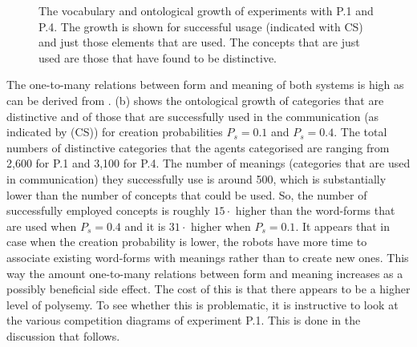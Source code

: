 \begin{figure}
\centering
{}
\caption{The vocabulary and ontological growth of experiments with P.1 and P.4. The growth is shown for successful usage (indicated with CS) and just those elements that are used. The concepts that are just used are those that have found to be distinctive.}
\label{f:opt:words}
\end{figure}

The one-to-many relations between form and meaning of both systems is high as can be derived from .  (b) shows the ontological growth of categories that are distinctive and of those that are successfully used in the communication (as indicated by (CS)) for creation probabilities $P_s=0.1$ and $P_s=0.4$. The total numbers of distinctive categories that the agents categorised are ranging from 2,600 for P.1 and 3,100 for P.4. The number of meanings (categories that are used in communication) they successfully use is around 500, which is substantially lower than the number of concepts that could be used. So, the number of successfully employed concepts is roughly $15 \cdot$ higher than the word-forms that are used when $P_s=0.4$ and it is $31 \cdot$ higher when $P_s=0.1$. It appears that in case when the creation probability is lower, the robots have more time to associate existing word-forms with meanings rather than to create new ones. This way the amount one-to-many relations between form and meaning increases as a possibly beneficial side effect. The cost of this is that there appears to be a higher level of polysemy. To see whether this is problematic, it is instructive to look at the various competition diagrams of experiment P.1. This is done in the discussion that follows.



